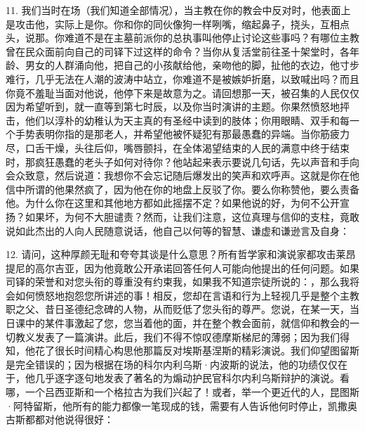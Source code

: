 11. 我们当时在场（我们知道全部情况），当主教在你的教会中反对时，他表面上是攻击他，实际上是你。你和你的同伙像狗一样咧嘴，缩起鼻子，挠头，互相点头，说那。你难道不是在主墓前派你的总执事叫他停止讨论这些事吗？有哪位主教曾在民众面前向自己的司铎下过这样的命令？当你从复活堂前往圣十架堂时，各年龄、男女的人群涌向他，把自己的小孩献给他，亲吻他的脚，扯他的衣边，他寸步难行，几乎无法在人潮的波涛中站立，你难道不是被嫉妒折磨，以致喊出吗？而且你竟不羞耻当面对他说，他停下来是故意为之。请回想那一天，被召集的人民仅仅因为希望听到，就一直等到第七时辰，以及你当时演讲的主题。你果然愤怒地抨击，他们以淳朴的幼稚认为天主真的有圣经中读到的肢体；你用眼睛、双手和每一个手势表明你指的是那老人，并希望他被怀疑犯有那最愚蠢的异端。当你筋疲力尽，口舌干燥，头往后仰，嘴唇颤抖，在全体渴望结束的人民的满意中终于结束时，那疯狂愚蠢的老头子如何对待你？他站起来表示要说几句话，先以声音和手向会众致意，然后说道：我想你不会忘记随后爆发出的笑声和欢呼声。这就是你在他信中所谓的他果然疯了，因为他在你的地盘上反驳了你。要么你称赞他，要么责备他。为什么你在这里和其他地方都如此摇摆不定？如果他说的好，为何不公开宣扬？如果坏，为何不大胆谴责？然而，让我们注意，这位真理与信仰的支柱，竟敢说如此杰出的人向人民随意说话，他自己以何等的智慧、谦虚和谦逊言及自身：\par

12. 请问，这种厚颜无耻和夸夸其谈是什么意思？所有哲学家和演说家都攻击莱昂提尼的高尔吉亚，因为他竟敢公开承诺回答任何人可能向他提出的任何问题。如果司铎的荣誉和对您头衔的尊重没有约束我，如果我不知道宗徒所说的：，那么我将会如何愤怒地抱怨您所讲述的事！相反，您却在言语和行为上轻视几乎是整个主教职之父、昔日圣德纪念碑的人物，从而贬低了您头衔的尊严。您说，在某一天，当日课中的某件事激起了您，您当着他的面，并在整个教会面前，就信仰和教会的一切教义发表了一篇演讲。此后，我们不得不惊叹德摩斯梯尼的薄弱；因为我们得知，他花了很长时间精心构思他那篇反对埃斯基涅斯的精彩演说。我们仰望图留斯是完全错误的；因为根据在场的科尔内利乌斯·内波斯的说法，他的功绩仅仅在于，他几乎逐字逐句地发表了著名的为煽动护民官科尔内利乌斯辩护的演说。看哪，一个吕西亚斯和一个格拉古为我们兴起了！或者，举一个更近代的人，昆图斯·阿特留斯，他所有的能力都像一笔现成的钱，需要有人告诉他何时停止，凯撒奥古斯都都对他说得很好：\par

